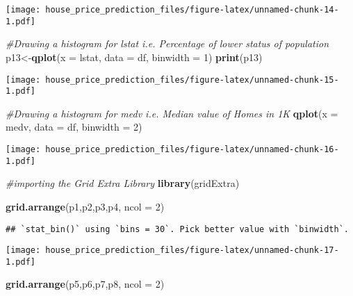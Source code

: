 \documentclass[
]{article}
\newenvironment{Shaded}{\begin{snugshade}}{\end{snugshade}}
\newcommand{\CommentTok}[1]{\textcolor[rgb]{0.56,0.35,0.01}{\textit{#1}}}
\newcommand{\DataTypeTok}[1]{\textcolor[rgb]{0.13,0.29,0.53}{#1}}
\newcommand{\DecValTok}[1]{\textcolor[rgb]{0.00,0.00,0.81}{#1}}
\newcommand{\KeywordTok}[1]{\textcolor[rgb]{0.13,0.29,0.53}{\textbf{#1}}}
\newcommand{\NormalTok}[1]{#1}
\begin{document}
\texttt{[image: house\_price\_prediction\_files/figure-latex/unnamed-chunk-14-1.pdf]}

\begin{Shaded}
\begin{Highlighting}[]
\CommentTok{#Drawing a histogram for lstat i.e. Percentage of lower status of population}
\NormalTok{p13<-}\KeywordTok{qplot}\NormalTok{(}\DataTypeTok{x =}\NormalTok{ lstat, }\DataTypeTok{data =}\NormalTok{ df, }\DataTypeTok{binwidth =} \DecValTok{1}\NormalTok{)}
\KeywordTok{print}\NormalTok{(p13)}
\end{Highlighting}
\end{Shaded}

\texttt{[image: house\_price\_prediction\_files/figure-latex/unnamed-chunk-15-1.pdf]}

\begin{Shaded}
\begin{Highlighting}[]
\CommentTok{#Drawing a histogram for medv i.e. Median value of Homes in 1K}
\KeywordTok{qplot}\NormalTok{(}\DataTypeTok{x =}\NormalTok{ medv, }\DataTypeTok{data =}\NormalTok{ df, }\DataTypeTok{binwidth =} \DecValTok{2}\NormalTok{)}
\end{Highlighting}
\end{Shaded}

\texttt{[image: house\_price\_prediction\_files/figure-latex/unnamed-chunk-16-1.pdf]}

\begin{Shaded}
\begin{Highlighting}[]
\CommentTok{#importing the Grid Extra Library}
\KeywordTok{library}\NormalTok{(gridExtra)}

\KeywordTok{grid.arrange}\NormalTok{(p1,p2,p3,p4, }\DataTypeTok{ncol =} \DecValTok{2}\NormalTok{)}
\end{Highlighting}
\end{Shaded}

\begin{verbatim}
## `stat_bin()` using `bins = 30`. Pick better value with `binwidth`.
\end{verbatim}

\texttt{[image: house\_price\_prediction\_files/figure-latex/unnamed-chunk-17-1.pdf]}

\begin{Shaded}
\begin{Highlighting}[]
\KeywordTok{grid.arrange}\NormalTok{(p5,p6,p7,p8, }\DataTypeTok{ncol =} \DecValTok{2}\NormalTok{)}
\end{Highlighting}
\end{Shaded}
\end{document}
